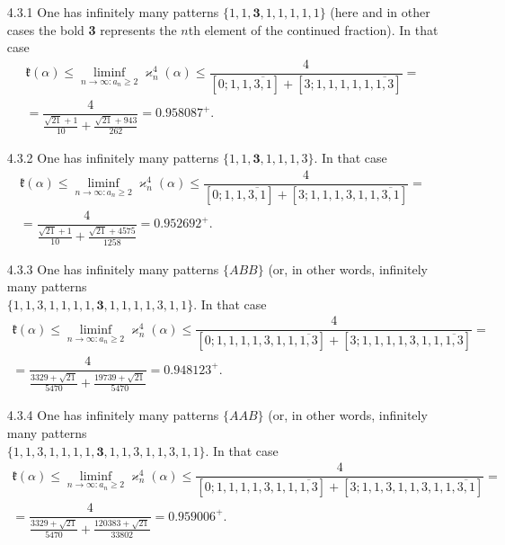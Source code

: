 \documentclass{article}
\begin{document}
\begin{itemize}
\item[4.3.1] One has infinitely many patterns $\{1, 1, \boldsymbol{3}, 1, 1, 1, 1, 1\}$ (here and in other cases the bold \textbf{3} represents the $n$th element of the continued fraction). In that case
\begin{multline*}
\mathfrak{k}(\alpha) \leqslant \liminf\limits_{n\to\infty\colon a_n\geqslant 2}\varkappa^4_n(\alpha) \leqslant \dfrac{4}{[0;1,1,\overline{3,1}] + [3;1,1,1,1,1,\overline{1,3}]} =\\= \dfrac{4}{\frac{\sqrt{21}+1}{10} + \frac{\sqrt{21}+943}{262}} = 0.958087^+.
\end{multline*}
\item[4.3.2] One has infinitely many patterns $\{1, 1, \boldsymbol{3}, 1, 1, 1, 3\}$. In that case
\begin{multline*}
\mathfrak{k}(\alpha) \leqslant \liminf\limits_{n\to\infty\colon a_n\geqslant 2}\varkappa^4_n(\alpha) \leqslant \dfrac{4}{[0;1,1,\overline{3,1}] + [3;1,1,1,3,1,1,\overline{3,1}]} =\\= \dfrac{4}{\frac{\sqrt{21}+1}{10} + \frac{\sqrt{21}+4575}{1258}} = 0.952692^+.
\end{multline*}
\item[4.3.3] One has infinitely many patterns $\{ABB\}$ (or, in other words, infinitely many patterns \\$\{1, 1, 3, 1, 1, 1, 1, \boldsymbol{3}, 1, 1, 1, 1, 3, 1, 1\}$. In that case
\begin{multline*}
\mathfrak{k}(\alpha) \leqslant \liminf\limits_{n\to\infty\colon a_n\geqslant 2}\varkappa^4_n(\alpha) \leqslant \dfrac{4}{[0;1,1,1,1,3,1,1,\overline{1,3}]+[3;1,1,1,1,3,1,1,\overline{1,3}]} =\\= \dfrac{4}{\frac{3329+\sqrt{21}}{5470} + \frac{19739+\sqrt{21}}{5470}} = 0.948123^+.
\end{multline*}
\item[4.3.4] One has infinitely many patterns $\{AAB\}$ (or, in other words, infinitely many patterns \\$\{1, 1, 3, 1, 1, 1, 1, \boldsymbol{3}, 1, 1, 3, 1, 1, 3, 1, 1\}$. In that case
\begin{multline*}
\mathfrak{k}(\alpha) \leqslant \liminf\limits_{n\to\infty\colon a_n\geqslant 2}\varkappa^4_n(\alpha) \leqslant \dfrac{4}{[0;1,1,1,1,3,1,1,\overline{1,3}]+[3;1,1,3,1,1,3,1,1,\overline{3,1}]} =\\= \dfrac{4}{\frac{3329+\sqrt{21}}{5470} + \frac{120383+\sqrt{21}}{33802}}= 0.959006^+.
\end{multline*}

\end{itemize}
\end{document}
